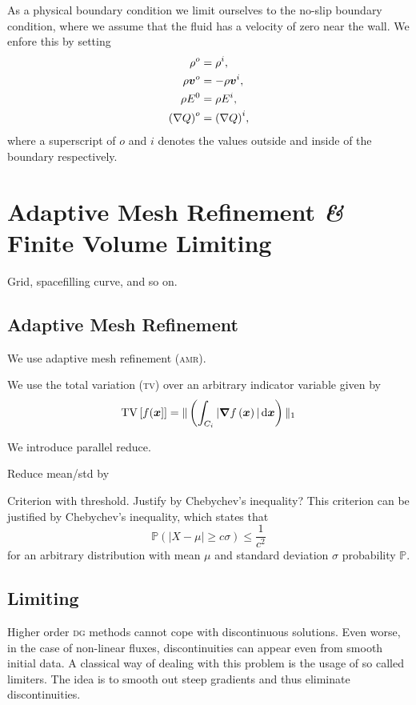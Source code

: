 As a physical boundary condition we limit ourselves to the no-slip boundary condition, where we assume that the fluid has a velocity of zero near the wall.
We enfore this by setting
\begin{align}
  \label{eq:no-slip}
  \begin{split}
  \rho^o &= \rho^i, \\
  \rho \bm{v}^o &= -\rho \bm{v}^i, \\
  \rho E^0 &= \rho E^i,\\
  {(\nabla Q)}^o &= {(\nabla Q)}^i,
  \end{split}
\end{align}
where a superscript of $o$ and $i$ denotes the values outside and inside of the boundary respectively.

\section{Adaptive Mesh Refinement \textit{\&} Finite Volume Limiting}\label{sec:grid}
Grid, spacefilling curve, and so on.

\subsection{Adaptive Mesh Refinement}\label{sec:amr}
We use adaptive mesh refinement (\textsc{amr}).

We use the total variation (\textsc{tv}) over an arbitrary indicator variable given by
\begin{equation}
  \label{eq:tv}
  \operatorname{TV}\left[ f(\bm{x}] \right] =
\Vert \left(\intdcell{ \vert \gradient{f \left( \bm{x} \right)} \vert } \right) \Vert_1
\end{equation}

We introduce parallel reduce.

Reduce mean/std by~\cite{chan1982updating}

Criterion with threshold.
Justify by Chebychev's inequality?
This criterion can be justified by Chebychev's inequality, which states that
\begin{equation}
  \label{eq:chebychev}
  \mathbb{P}(\vert X - \mu \vert \geq c \sigma) \leq \frac{1}{c^2}
\end{equation}
for an arbitrary distribution with mean $\mu$ and standard deviation $\sigma$ probability $\mathbb{P}$.


\subsection{Limiting}\label{sec:limiting}
Higher order \textsc{dg} methods cannot cope with discontinuous solutions.
Even worse, in the case of non-linear fluxes, discontinuities can appear even from smooth initial data.
A classical way of dealing with this problem is the usage of so called limiters.
The idea is to smooth out steep gradients and thus eliminate discontinuities.

